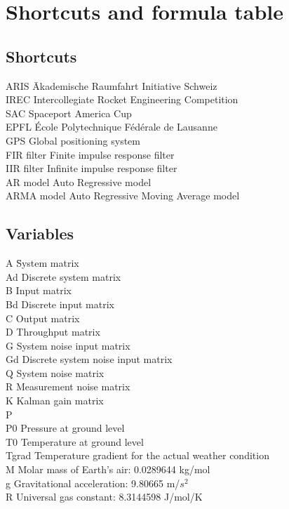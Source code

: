 \chapter{Shortcuts and formula table}
\section{Shortcuts}
\begin{tabbing}
 ARIS    \hspace{5cm} \= Akademische Raumfahrt Initiative Schweiz \\
 IREC 		\> Intercollegiate Rocket Engineering Competition \\
 SAC		\> Spaceport America Cup \\
 EPFL	  	\> École Polytechnique Fédérale de Lausanne \\
 GPS 		\> Global positioning system \\
 FIR filter 	\> Finite impulse response filter\\
 IIR filter 	\> Infinite impulse response filter\\
 AR model 	\> Auto Regressive model\\
 ARMA model 	\> Auto Regressive Moving Average model \\


\end{tabbing}

\section{Variables}
\begin{tabbing}
 A \hspace{5cm}	\= System matrix \\
 Ad 		\> Discrete system matrix \\
 B 		\> Input matrix \\
 Bd 		\> Discrete input matrix \\
 C 		\> Output matrix \\
 D 		\> Throughput matrix \\
 G 		\> System noise input matrix \\
 Gd 		\> Discrete system noise input matrix \\
 Q 		\> System noise matrix \\
 R 		\> Measurement noise matrix \\
 K 		\> Kalman gain matrix \\
 P 		\>  \\ %
 P0 		\> Pressure at ground level \\
 T0 		\> Temperature at ground level \\
 Tgrad 		\> Temperature gradient for the actual weather condition \\
 M 		\> Molar mass of Earth's air: 0.0289644 kg/mol\\
 g 		\> Gravitational acceleration: 9.80665 m/$s^2$\\
 R 		\> Universal gas constant: 8.3144598 J/mol/K\\

\end{tabbing}

